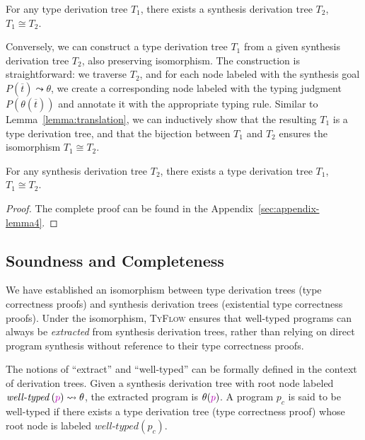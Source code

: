 \documentclass[manuscript,screen]{acmart}
\newcommand{\sk}[1]{\textcolor{skunknown}{#1}}
\newcommand{\welltyped}[1]{\mathit{well\text{-}typed}\left(#1\right)}
\newcommand{\toolname}[1]{\textsc{#1}}
\newcommand{\mainname}{\toolname{TyFlow}\xspace}
\begin{document}
\begin{lemma}
\label{lemma:isomorphism1}
For any type derivation tree $T_1$, there exists a synthesis derivation tree $T_2$, $T_1 \cong T_2$.
\end{lemma}

Conversely, we can construct a type derivation tree $T_1$ from a given synthesis derivation tree $T_2$, also preserving isomorphism. The construction is straightforward: we traverse $T_2$, and for each node labeled with the synthesis goal $P(\overline{t}) \leadsto \theta$, we create a corresponding node labeled with the typing judgment $P(\theta(\overline{t}))$ and annotate it with the appropriate typing rule. Similar to Lemma~\ref{lemma:translation}, we can inductively show that the resulting $T_1$ is a type derivation tree, and that the bijection between $T_1$ and $T_2$ ensures the isomorphism $T_1 \cong T_2$.

\begin{lemma}
\label{lemma:isomorphism2}
For any synthesis derivation tree $T_2$, there exists a type derivation tree $T_1$, $T_1 \cong T_2$.
\end{lemma}
\begin{proof}
  The complete proof can be found in the Appendix~\ref{sec:appendix-lemma4}.
\end{proof}

\subsection{Soundness and Completeness}
\label{sec:soundness-completeness}
We have established an isomorphism between type derivation trees (type correctness proofs) and synthesis derivation trees (existential type correctness proofs). 
Under the isomorphism, \mainname ensures that well-typed programs can always be \emph{extracted} from synthesis derivation trees, rather than relying on direct program synthesis without reference to their type correctness proofs.

The notions of ``extract'' and ``well-typed'' can be formally defined in the context of derivation trees. 
Given a synthesis derivation tree with root node labeled $\welltyped{\sk{p}} \leadsto \theta$, the extracted program is $\theta(\sk{p})$.    {\color{revblue}A } program $p_c$ is said to be well-typed if there exists a type derivation tree (type correctness proof) whose root node is labeled $\welltyped{p_c}$.
\end{document}
